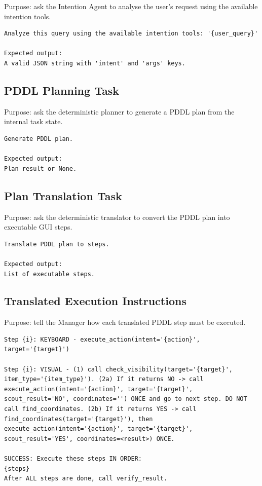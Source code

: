 Purpose: ask the Intention Agent to analyse the user's request using the available intention tools.

\begin{lstlisting}
Analyze this query using the available intention tools: '{user_query}'

Expected output:
A valid JSON string with 'intent' and 'args' keys.
\end{lstlisting}

\subsection{PDDL Planning Task}

Purpose: ask the deterministic planner to generate a PDDL plan from the internal task state.

\begin{lstlisting}
Generate PDDL plan.

Expected output:
Plan result or None.
\end{lstlisting}

\subsection{Plan Translation Task}

Purpose: ask the deterministic translator to convert the PDDL plan into executable GUI steps.

\begin{lstlisting}
Translate PDDL plan to steps.

Expected output:
List of executable steps.
\end{lstlisting}

\subsection{Translated Execution Instructions}

Purpose: tell the Manager how each translated PDDL step must be executed.

\begin{lstlisting}
Step {i}: KEYBOARD - execute_action(intent='{action}', target='{target}')

Step {i}: VISUAL - (1) call check_visibility(target='{target}', item_type='{item_type}'). (2a) If it returns NO -> call execute_action(intent='{action}', target='{target}', scout_result='NO', coordinates='') ONCE and go to next step. DO NOT call find_coordinates. (2b) If it returns YES -> call find_coordinates(target='{target}'), then execute_action(intent='{action}', target='{target}', scout_result='YES', coordinates=<result>) ONCE.

SUCCESS: Execute these steps IN ORDER:
{steps}
After ALL steps are done, call verify_result.
\end{lstlisting}

